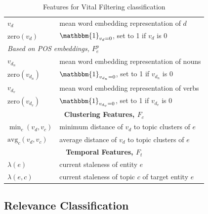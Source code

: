 \documentclass{article}
\begin{document}
\begin{table}[tb]
{\begin{tabular}{p{}p{}}
  $v_d$ & mean word embedding representation of $d$ \\
  $\text{zero}(v_d)$& $\mathbbm{1}_{v_d=0}$, set to 1 if $v_d$ is $0$ \\
\multicolumn{2}{l}{\emph{Based on POS embeddings, $F_e^p$}} \\ %
  $v_{d_n}$ & mean word embedding representation of nouns\\ %
  $\text{zero}(v_{d_n})$& $\mathbbm{1}_{v_{d_n}=0}$, set to 1 if $v_{d_n}$ is $0$ \\
  $v_{d_v}$ & mean word embedding representation of verbs \\ %
  $\text{zero}(v_{d_v})$& $\mathbbm{1}_{v_{d_v}=0}$, set to 1 if $v_{d_v}$ is $0$ \\
\midrule
\multicolumn{2}{c}{\textbf{Clustering Features, $F_c$}} \\ %
\midrule
  $\min_c(v_d,v_c)$& minimum distance of $v_d$ to topic clusters of $e$ \\
  $\text{avg}_c(v_d,v_c)$& average distance of $v_d$ to topic clusters of $e$ \\
\midrule
\multicolumn{2}{c}{\textbf{Temporal Features, $F_t$}} \\ %
\midrule
  $\lambda(e)$& current staleness of entity $e$ \\
  $\lambda(e,c)$& current staleness of topic $c$ of target entity $e$ \\
\bottomrule
\end{tabular}
} %
\caption{Features for Vital Filtering classification}
\label{features}
\end{table}


\subsection{Relevance Classification}
\end{document}
